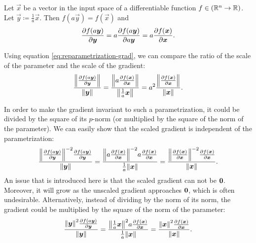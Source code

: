 \documentclass[oneside]{book}
\begin{document}
Let $\vec x$ be a vector in the input space of a differentiable function $f\in\del{\R^n\to\R}$. Let $\vec y \coloneqq \frac{1}{a}\vec x$. Then $f(a\vec y)=f(\vec x)$ and
\begin{align}
    \pd{f\del{a\vec y}}{\vec y} = a\pd{f(a\vec y)}{a\vec y} = a\pd{f(\vec x)}{\vec x} \text{.}  \label{eq:reparametrization-grad}
\end{align}

Using equation \eqref{eq:reparametrization-grad}, we can compare the ratio of the scale of the parameter and the scale of the gradient:
\begin{align}
    \frac{\enVert{\pd{f\del{a\vec y}}{\vec y}}}{\enVert{\vec y}}
    = \frac{\enVert{a\pd{f(\vec x)}{\vec x}}}{\enVert{\frac{1}{a}\vec x}}
    = a^2\frac{\enVert{\pd{f(\vec x)}{\vec x}}}{\enVert{\vec x}} \text{.}
\end{align}

In order to make the gradient invariant to such a parametrization, it could be divided by the square of its $p$-norm (or multiplied by the square of the norm of the parameter).
We can easily show that the scaled gradient is independent of the parametrization:
\begin{align}
    \frac{\enVert{\pd{f\del{a\vec y}}{\vec y}}^{-2}\pd{f\del{a\vec y}}{\vec y}}{\enVert{\vec y}}
    = \frac{\enVert{a\pd{f\del{\vec x}}{\vec x}}^{-2}a\pd{f\del{\vec x}}{\vec x}}{\frac{1}{a}\enVert{\vec x}}
    = \frac{\enVert{\pd{f\del{\vec x}}{\vec x}}^{-2}\pd{f\del{\vec x}}{\vec x}}{\enVert{\vec x}} \text{.}
\end{align}
An issue that is introduced here is that the scaled gradient can not be $\mathbf{0}$. Moreover, it will grow as the unscaled gradient approaches $\mathbf{0}$, which is often undesirable. Alternatively, instead of dividing by the norm of its norm, the gradient could be multiplied by the square of the norm of the parameter:
\begin{align}
    \frac{\enVert{\vec y}^{2}\pd{f\del{a\vec y}}{\vec y}}{\enVert{\vec y}}
    = \frac{\enVert{\frac{1}{a}\vec x}^{2}a\pd{f\del{\vec x}}{\vec x}}{\frac{1}{a}\enVert{\vec x}}
    = \frac{\enVert{\vec x}^{2}\pd{f\del{\vec x}}{\vec x}}{\enVert{\vec x}} \text{.} \\
\end{align}
\end{document}
